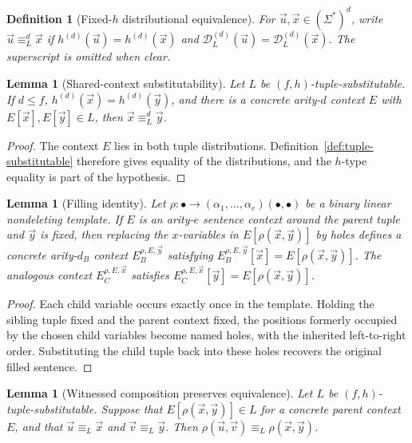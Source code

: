 \documentclass[11pt,a4paper]{article}
\newtheorem{lemma}[theorem]{Lemma}
\newtheorem{definition}[theorem]{Definition}
\theoremstyle{remark}
\newcommand{\D}{\mathcal{D}}
\newcommand{\tuple}[1]{\vec{#1}}
\begin{document}
\begin{definition}[Fixed-\(h\) distributional equivalence]
\label{def:distributional-equivalence}
For \(\tuple u,\tuple x\in(\Sigma^*)^d\), write
\(\tuple u\equiv_L^d\tuple x\) if
\(h^{(d)}(\tuple u)=h^{(d)}(\tuple x)\) and
\(\D_L^{(d)}(\tuple u)=\D_L^{(d)}(\tuple x)\).  The superscript is omitted when
clear.
\end{definition}

\begin{lemma}[Shared-context substitutability]
\label{lem:shared-context}
Let \(L\) be \((f,h)\)-tuple-substitutable.  If \(d\le f\),
\(h^{(d)}(\tuple x)=h^{(d)}(\tuple y)\), and there is a concrete arity-\(d\)
context \(E\) with \(E[\tuple x],E[\tuple y]\in L\), then
\(\tuple x\equiv_L^d\tuple y\).
\end{lemma}

\begin{proof}
The context \(E\) lies in both tuple distributions.  Definition~\ref{def:tuple-substitutable}
therefore gives equality of the distributions, and the \(h\)-type equality is
part of the hypothesis.
\end{proof}

\begin{lemma}[Filling identity]
\label{lem:filling-identity}
Let \(\rho\colon\bullet\to(\alpha_1,\ldots,\alpha_e)(\bullet,\bullet)\) be a
binary linear nondeleting template.  If \(E\) is an arity-\(e\) sentence context
around the parent tuple and \(\tuple y\) is fixed, then replacing the
\(x\)-variables in \(E[\rho(\tuple x,\tuple y)]\) by holes defines a concrete
arity-\(d_B\) context \(E_B^{\rho,E,\tuple y}\) satisfying
\(E_B^{\rho,E,\tuple y}[\tuple x]=E[\rho(\tuple x,\tuple y)]\).  The analogous
context \(E_C^{\rho,E,\tuple x}\) satisfies
\(E_C^{\rho,E,\tuple x}[\tuple y]=E[\rho(\tuple x,\tuple y)]\).
\end{lemma}

\begin{proof}
Each child variable occurs exactly once in the template.  Holding the sibling
tuple fixed and the parent context fixed, the positions formerly occupied by
the chosen child variables become named holes, with the inherited left-to-right
order.  Substituting the child tuple back into these holes recovers the original
filled sentence.
\end{proof}

\begin{lemma}[Witnessed composition preserves equivalence]
\label{lem:witnessed-composition}
Let \(L\) be \((f,h)\)-tuple-substitutable.  Suppose that
\(E[\rho(\tuple x,\tuple y)]\in L\) for a concrete parent context \(E\), and
that \(\tuple u\equiv_L\tuple x\) and \(\tuple v\equiv_L\tuple y\).  Then
\(\rho(\tuple u,\tuple v)\equiv_L\rho(\tuple x,\tuple y)\).
\end{lemma}
\end{document}

